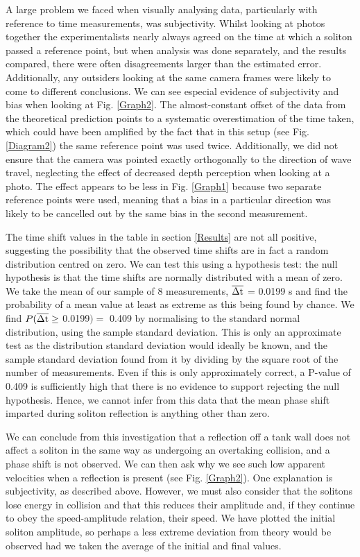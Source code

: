 \documentclass[10pt, twocolumn]{revtex4}    %
\begin{document}
A large problem we faced when visually analysing data, particularly with reference to time measurements, was subjectivity. Whilst looking at photos together the experimentalists nearly always agreed on the time at which a soliton passed a reference point, but when analysis was done separately, and the results compared, there were often disagreements larger than the estimated error. Additionally, any outsiders looking at the same camera frames were likely to come to different conclusions. We can see especial evidence of subjectivity and bias when looking at Fig. \ref{Graph2}. The almost-constant offset of the data from the theoretical prediction points to a systematic overestimation of the time taken, which could have been amplified by the fact that in this setup (see Fig. \ref{Diagram2}) the same reference point was used twice. Additionally, we did not ensure that the camera was pointed exactly orthogonally to the direction of wave travel, neglecting the effect of decreased depth perception when looking at a photo. The effect appears to be less in Fig. \ref{Graph1} because two separate reference points were used, meaning that a bias in a particular direction was likely to be cancelled out by the same bias in the second measurement. 

The time shift values in the table in section \ref{Results} are not all positive, suggesting the possibility that the observed time shifts are in fact a random distribution centred on zero. We can test this using a hypothesis test: the null hypothesis is that the time shifts are normally distributed with a mean of zero. We take the mean of our sample of 8 measurements, $\overline{\rm \Delta t}$ = 0.0199 s and find the probability of a mean value at least as extreme as this being found by chance. We find $P(\overline{\rm \Delta t} \geq $ 0.0199$) =$ 0.409 by normalising to the standard normal distribution, using the sample standard deviation. This is only an approximate test as the distribution standard deviation would ideally be known, and the sample standard deviation found from it by dividing by the square root of the number of measurements. Even if this is only approximately correct, a P-value of 0.409 is sufficiently high that there is no evidence to support rejecting the null hypothesis. Hence, we cannot infer from this data that the mean phase shift imparted during soliton reflection is anything other than zero. 

We can conclude from this investigation that a reflection off a tank wall does not affect a soliton in the same way as undergoing an overtaking collision, and a phase shift is not observed. We can then ask why we see such low apparent velocities when a reflection is present (see Fig. \ref{Graph2}). One explanation is subjectivity, as described above. However, we must also consider that the solitons lose energy in collision and that this reduces their amplitude and, if they continue to obey the speed-amplitude relation, their speed. We have plotted the initial soliton amplitude, so perhaps a less extreme deviation from theory would be observed had we taken the average of the initial and final values. 
\end{document}
